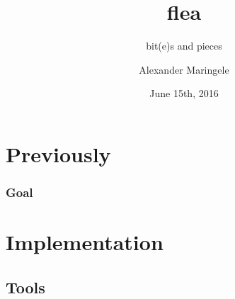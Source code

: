 



\author{Alexander Maringele}
\title{flea\\
}
\subtitle{bit(e)s and pieces}
\date{June 15th, 2016}

%



 



\frame{
	\setcounter{tocdepth}{1}
	\tableofcontents}

%

%





%

\section{Previously}

\begin{frame}
	\frametitle{Goal}



\end{frame}



\section{Implementation}

\frame{

}

\subsection{Tools}

